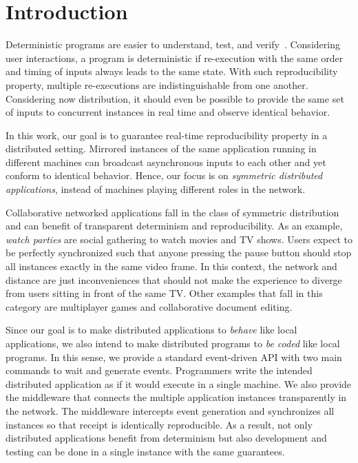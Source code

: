 \documentclass[sigplan,screen]{acmart}
\begin{document}
\section{Introduction}

Deterministic programs are easier to understand, test, and verify~\cite{det}.
Considering user interactions, a program is deterministic if re-execution with
the same order and timing of inputs always leads to the same state.
With such reproducibility property, multiple re-executions are
indistinguishable from one another.
Considering now distribution, it should even be possible to provide the same
set of inputs to concurrent instances in real time and observe identical
behavior.

In this work, our goal is to guarantee real-time reproducibility property in a
distributed setting.
Mirrored instances of the same application running in different machines can
broadcast asynchronous inputs to each other and yet conform to
identical behavior.
Hence, our focus is on \emph{symmetric distributed applications}, instead of
machines playing different roles in the network.

Collaborative networked applications fall in the class of symmetric
distribution and can benefit of transparent determinism and reproducibility.
As an example, \emph{watch parties} are social gathering to watch movies and TV
shows.
Users expect to be perfectly synchronized such that anyone pressing the pause
button should stop all instances exactly in the same video frame.
In this context, the network and distance are just inconveniences that should
not make the experience to diverge from users sitting in front of the same TV.
Other examples that fall in this category are multiplayer games and
collaborative document editing.

Since our goal is to make distributed applications to \emph{behave} like local
applications, we also intend to make distributed programs to \emph{be coded}
like local programs.
In this sense, we provide a standard event-driven API with two main commands
to wait and generate events.
Programmers write the intended distributed application as if it would execute
in a single machine.
We also provide the middleware that connects the multiple application instances
transparently in the network.
The middleware intercepts event generation and synchronizes all instances so
that receipt is identically reproducible.
As a result, not only distributed applications benefit from determinism but
also development and testing can be done in a single instance with the same
guarantees.
\end{document}
